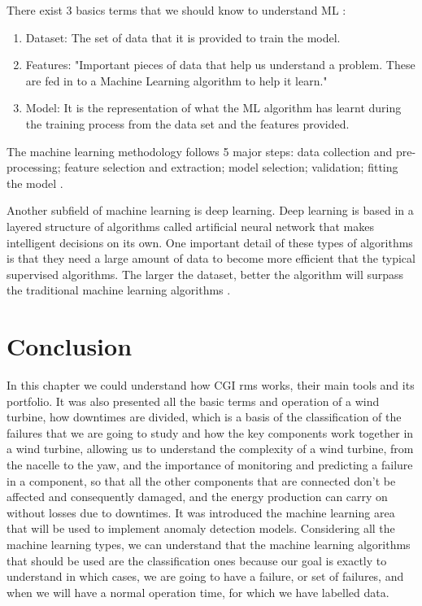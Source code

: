There exist 3 basics terms that we should know to understand ML \cite{46_ML}:
\begin{enumerate}
    \item{Dataset:}
The set of data that it is provided to train the model.
    \item{Features:}
"Important pieces of data that help us understand a problem. These are fed in to a Machine Learning algorithm to help it learn."
    \item{Model:}
It is the representation of what the ML algorithm has learnt during the training process from the data set and the features provided.
\end{enumerate}

The machine learning methodology follows 5 major steps: data collection and pre-processing; feature selection and extraction; model selection; validation; fitting the model \cite{OLD_15_WIND} \cite{46_ML}.

Another subfield of machine learning is deep learning. Deep learning is based in a layered structure of algorithms called artificial neural network that makes intelligent decisions on its own. One important detail of these types of algorithms is that they need a large amount of data to become more efficient that the typical supervised algorithms. The larger the dataset, better the algorithm will surpass the traditional machine learning algorithms \cite{ML_Deep_Learning_2} \cite{ML_Deep_Learning}.


\section{Conclusion} 
\label{sub:if_you_use_this_template} 

In this chapter we could understand how CGI \acrshort{rms} works, their main tools and its portfolio. It was also presented all the basic terms and operation of a wind turbine, how downtimes are divided, which is a basis of the classification of the failures that we are going to study and how the key components work together in a wind turbine, allowing us to understand the complexity of a wind turbine, from the nacelle to the yaw, and the importance of monitoring and predicting a failure in a component, so that all the other components that are connected don't be affected and consequently damaged, and the energy production can carry on without losses due to downtimes. It was introduced the machine learning area that will be used to implement anomaly detection models. Considering all the machine learning types, we can understand that the machine learning algorithms that should be used are the classification ones because our goal is exactly to understand in which cases, we are going to have a failure, or set of failures, and when we will have a normal operation time, for which we have labelled data.
